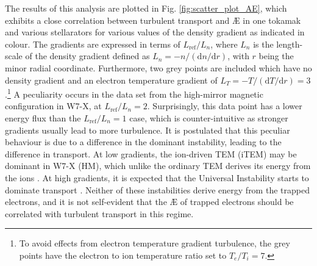 The results of this analysis are plotted in Fig. \ref{fig:scatter_plot_AE}, which exhibits a close correlation between turbulent transport and \AE{} in one tokamak and various stellarators for various values of the density gradient as indicated in colour. The gradients are expressed in terms of $L_\text{ref}/L_n$, where $L_n$ is the length-scale of the density gradient defined as $L_n= -n/(\mathrm{d} n / \mathrm{d} r)$, with $r$ being the minor radial coordinate. Furthermore, two grey points are included which have no density gradient and an electron temperature gradient of $L_{T}= -T/(\mathrm{d} T / \mathrm{d} r) = 3$.\footnote{To avoid effects from electron temperature gradient turbulence, the grey points have the electron to ion temperature ratio set to $T_e/T_i=7$.} A peculiarity occurs in the data set from the high-mirror magnetic configuration in W7-X, at $L_\text{ref}/L_n=2$. Surprisingly,  this data point has a lower  energy flux than the $L_\text{ref}/L_n=1$ case, which is counter-intuitive as stronger gradients usually lead to more turbulence. It is postulated that this peculiar behaviour is due to a difference in the dominant instability, leading to the difference in transport. At low gradients, the ion-driven TEM (iTEM) may be dominant in W7-X (HM), which unlike the ordinary TEM derives its energy from the ions \citep{Plunk2017CollisionlessMode}. At high gradients, it is expected that the Universal Instability starts to dominate transport \cite{Landreman2015UniversalScale,Helander2015TheGeometry,costello2023universal}. Neither of these instabilities derive energy from the trapped electrons, and it is not self-evident that the \AE{} of trapped electrons should be correlated with turbulent transport in this regime. \par
